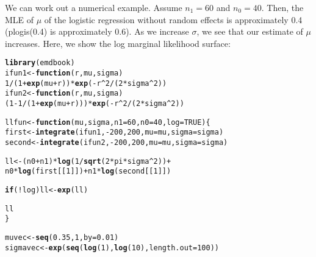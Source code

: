 \documentclass{article}\usepackage[]{graphicx}\usepackage[]{color}
\makeatletter
\newcommand{\hlnum}[1]{\textcolor[rgb]{0.686,0.059,0.569}{#1}}%
\newcommand{\hlopt}[1]{\textcolor[rgb]{0,0,0}{#1}}%
\newcommand{\hlstd}[1]{\textcolor[rgb]{0.345,0.345,0.345}{#1}}%
\newcommand{\hlkwa}[1]{\textcolor[rgb]{0.161,0.373,0.58}{\textbf{#1}}}%
\newcommand{\hlkwb}[1]{\textcolor[rgb]{0.69,0.353,0.396}{#1}}%
\newcommand{\hlkwc}[1]{\textcolor[rgb]{0.333,0.667,0.333}{#1}}%
\newcommand{\hlkwd}[1]{\textcolor[rgb]{0.737,0.353,0.396}{\textbf{#1}}}%
\newenvironment{kframe}{%
 \def\at@end@of@kframe{}%
 \ifinner\ifhmode%
  \def\at@end@of@kframe{\end{minipage}}%
  \begin{minipage}{\columnwidth}%
 \fi\fi%
 \def\FrameCommand##1{\hskip\@totalleftmargin \hskip-\fboxsep
 \colorbox{shadecolor}{##1}\hskip-\fboxsep
     \hskip-\linewidth \hskip-\@totalleftmargin \hskip\columnwidth}%
 \MakeFramed {\advance\hsize-\width
   \@totalleftmargin\z@ \linewidth\hsize
   \@setminipage}}%
 {\par\unskip\endMakeFramed%
 \at@end@of@kframe}
\newenvironment{knitrout}{}{} %
\makeatother
\begin{document}
We can work out a numerical example. Assume $n_1 = 60$ and $n_0=40$. Then, the MLE of $\mu$ of the logistic regression without random effects is approximately 0.4 (plogis(0.4) is approximately 0.6). As we increase $\sigma$, we see that our estimate of $\mu$ increases. Here, we show the log marginal likelihood surface:
\begin{knitrout}
\color{fgcolor}\begin{kframe}
\begin{alltt}
\hlkwd{library}\hlstd{(emdbook)}
\hlstd{ifun1} \hlkwb{<-} \hlkwa{function}\hlstd{(}\hlkwc{r}\hlstd{,} \hlkwc{mu}\hlstd{,} \hlkwc{sigma}\hlstd{)}
        \hlnum{1}\hlopt{/}\hlstd{(}\hlnum{1} \hlopt{+} \hlkwd{exp}\hlstd{(mu} \hlopt{+} \hlstd{r))} \hlopt{*} \hlkwd{exp}\hlstd{(}\hlopt{-}\hlstd{r}\hlopt{^}\hlnum{2}\hlopt{/}\hlstd{(}\hlnum{2} \hlopt{*} \hlstd{sigma}\hlopt{^}\hlnum{2}\hlstd{))}
\hlstd{ifun2} \hlkwb{<-} \hlkwa{function}\hlstd{(}\hlkwc{r}\hlstd{,} \hlkwc{mu}\hlstd{,} \hlkwc{sigma}\hlstd{)}
        \hlstd{(}\hlnum{1} \hlopt{-} \hlnum{1}\hlopt{/}\hlstd{(}\hlnum{1} \hlopt{+} \hlkwd{exp}\hlstd{(mu} \hlopt{+} \hlstd{r)))} \hlopt{*} \hlkwd{exp}\hlstd{(}\hlopt{-}\hlstd{r}\hlopt{^}\hlnum{2}\hlopt{/}\hlstd{(}\hlnum{2} \hlopt{*} \hlstd{sigma}\hlopt{^}\hlnum{2}\hlstd{))}

\hlstd{llfun} \hlkwb{<-} \hlkwa{function}\hlstd{(}\hlkwc{mu}\hlstd{,} \hlkwc{sigma}\hlstd{,} \hlkwc{n1}\hlstd{=}\hlnum{60}\hlstd{,} \hlkwc{n0}\hlstd{=}\hlnum{40}\hlstd{,} \hlkwc{log}\hlstd{=}\hlnum{TRUE}\hlstd{) \{}
        \hlstd{first} \hlkwb{<-} \hlkwd{integrate}\hlstd{(ifun1,} \hlopt{-}\hlnum{200}\hlstd{,} \hlnum{200}\hlstd{,} \hlkwc{mu}\hlstd{=mu,} \hlkwc{sigma}\hlstd{=sigma)}
        \hlstd{second} \hlkwb{<-} \hlkwd{integrate}\hlstd{(ifun2,} \hlopt{-}\hlnum{200}\hlstd{,} \hlnum{200}\hlstd{,} \hlkwc{mu}\hlstd{=mu,} \hlkwc{sigma}\hlstd{=sigma)}

        \hlstd{ll} \hlkwb{<-} \hlstd{(n0} \hlopt{+} \hlstd{n1)} \hlopt{*} \hlkwd{log}\hlstd{(}\hlnum{1}\hlopt{/}\hlkwd{sqrt}\hlstd{(}\hlnum{2} \hlopt{*} \hlstd{pi} \hlopt{*} \hlstd{sigma}\hlopt{^}\hlnum{2}\hlstd{))} \hlopt{+}
                \hlstd{n0} \hlopt{*} \hlkwd{log}\hlstd{(first[[}\hlnum{1}\hlstd{]])} \hlopt{+} \hlstd{n1} \hlopt{*} \hlkwd{log}\hlstd{(second[[}\hlnum{1}\hlstd{]])}

        \hlkwa{if} \hlstd{(}\hlopt{!}\hlstd{log) ll} \hlkwb{<-} \hlkwd{exp}\hlstd{(ll)}

        \hlstd{ll}
\hlstd{\}}

\hlstd{muvec} \hlkwb{<-} \hlkwd{seq}\hlstd{(}\hlnum{0.35}\hlstd{,} \hlnum{1}\hlstd{,} \hlkwc{by}\hlstd{=}\hlnum{0.01}\hlstd{)}
\hlstd{sigmavec} \hlkwb{<-} \hlkwd{exp}\hlstd{(}\hlkwd{seq}\hlstd{(}\hlkwd{log}\hlstd{(}\hlnum{1}\hlstd{),} \hlkwd{log}\hlstd{(}\hlnum{10}\hlstd{),} \hlkwc{length.out}\hlstd{=}\hlnum{100}\hlstd{))}


\end{alltt}
\end{kframe}
\end{knitrout}
\end{document}

